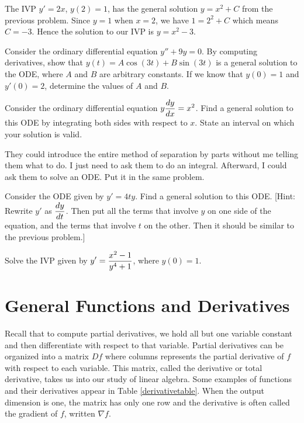 \begin{example}
The IVP $y' = 2x$, $y(2)=1$, has the general solution $y=x^2+C$ from the previous problem. Since $y=1$ when $x=2$, we have $1=2^2+C$ which means $C=-3$. Hence the solution to our IVP is $y=x^2-3$.
\end{example}

\begin{problem}
Consider the ordinary differential equation $y''+9y=0$. By computing derivatives, show that $y(t) = A\cos (3t)+B\sin (3t)$ is a general solution to the ODE, where $A$ and $B$ are arbitrary constants. If we know that $y(0)=1$ and $y'(0)=2$, determine the values of $A$ and $B$.
\end{problem}


\begin{problem}
Consider the ordinary differential equation $\displaystyle y\frac{dy}{dx} = x^2$.  Find a general solution to this ODE by integrating both sides with respect to $x$. State an interval on which your solution is valid. 
\end{problem}

They could introduce the entire method of separation by parts without me telling them what to do.  I just need to ask them to do an integral.  Afterward, I could ask them to solve an ODE.  Put it in the same problem. 

\begin{problem}
Consider the ODE given by $y' = 4ty$. Find a general solution to this ODE.  [Hint: Rewrite $y'$ as $\displaystyle \frac{dy}{dt}$.  Then put all the terms that involve $y$ on one side of the equation, and the terms that involve $t$ on the other.  Then it should be similar to the previous problem.]
\end{problem}

\begin{problem}
Solve the IVP given by $\displaystyle y' = \frac{x^2-1}{y^4+1}$, where $y(0)=1$. 
\end{problem}








\section{General Functions and Derivatives}
Recall that to compute partial derivatives, we hold all but one variable constant and then differentiate with respect to that variable. Partial derivatives can be organized into a matrix $Df$ where columns represents the partial derivative of $f$ with respect to each variable. This matrix, called the derivative or total derivative, takes us into our study of linear algebra. 
Some examples of functions and their derivatives appear in Table \ref{derivativetable}. When the output dimension is one, the matrix has only one row and the derivative is often called the gradient of $f$, written $\nabla f$.  

